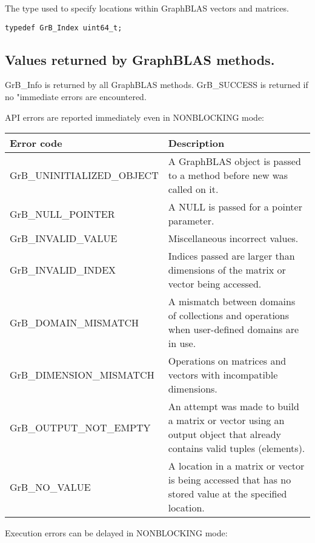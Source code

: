 \documentclass[11pt]{article}
\begin{document}
The type used to specify locations within GraphBLAS vectors and matrices.

\begin{verbatim}
typedef GrB_Index uint64_t;
\end{verbatim}

\subsection{Values returned by GraphBLAS methods.}

{\sf GrB\_Info} is returned by all GraphBLAS methods.  {\sf GrB\_SUCCESS} is returned if no "immediate errors are encountered.

API errors are reported immediately even in {\sf NONBLOCKING} mode:
\vspace{1\baselineskip}

\begin{tabular}{l|p{4.5in}} \hline
Error code	& Description \\ \hline
{\sf GrB\_UNINITIALIZED\_OBJECT} & A GraphBLAS object is passed to a method before {\sf new} was called on it.\\
{\sf GrB\_NULL\_POINTER} & A NULL is passed for a pointer parameter. \\
{\sf GrB\_INVALID\_VALUE} & Miscellaneous incorrect values. \\
{\sf GrB\_INVALID\_INDEX} & Indices passed are larger than dimensions of the matrix or vector being accessed. \\
{\sf GrB\_DOMAIN\_MISMATCH} & A mismatch between domains of collections and operations when user-defined domains are in use.\\
{\sf GrB\_DIMENSION\_MISMATCH} & Operations on matrices and vectors with incompatible dimensions. \\
{\sf GrB\_OUTPUT\_NOT\_EMPTY} & An attempt was made to build a matrix or vector using an output object that already contains valid tuples (elements).\\
{\sf GrB\_NO\_VALUE} & A location in a matrix or vector is being accessed that has no stored value at the specified location.\\ \hline
\end{tabular}

\vspace{1\baselineskip}
Execution errors can be delayed in {\sf NONBLOCKING} mode:
\vspace{1\baselineskip}
\end{document}
